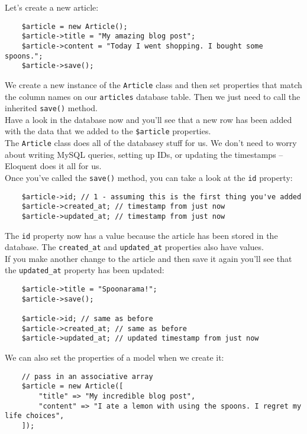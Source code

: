 Let's create a new article:

\begin{verbatim}
    $article = new Article();
    $article->title = "My amazing blog post";
    $article->content = "Today I went shopping. I bought some spoons.";
    $article->save();
\end{verbatim}

We create a new instance of the \texttt{Article} class and then set properties that match the column names on our \texttt{articles} database table. Then we just need to call the inherited \texttt{save()} method.
\\

Have a look in the database now and you'll see that a new row has been added with the data that we added to the \texttt{\$article} properties.
\\

The \texttt{Article} class does all of the databasey stuff for us. We don't need to worry about writing MySQL queries, setting up IDs, or updating the timestamps – Eloquent does it all for us.
\\

Once you've called the \texttt{save()} method, you can take a look at the \texttt{id} property:

\begin{verbatim}
    $article->id; // 1 - assuming this is the first thing you've added
    $article->created_at; // timestamp from just now
    $article->updated_at; // timestamp from just now
\end{verbatim}

The \texttt{id} property now has a value because the article has been stored in the database. The \texttt{created\_at} and \texttt{updated\_at} properties also have values.
\\

If you make another change to the article and then save it again you'll see that the \texttt{updated\_at} property has been updated:

\begin{verbatim}
    $article->title = "Spoonarama!";
    $article->save();

    $article->id; // same as before
    $article->created_at; // same as before
    $article->updated_at; // updated timestamp from just now
\end{verbatim}

We can also set the properties of a model when we create it:

\begin{verbatim}
    // pass in an associative array
    $article = new Article([
        "title" => "My incredible blog post",
        "content" => "I ate a lemon with using the spoons. I regret my life choices",
    ]);
\end{verbatim}

